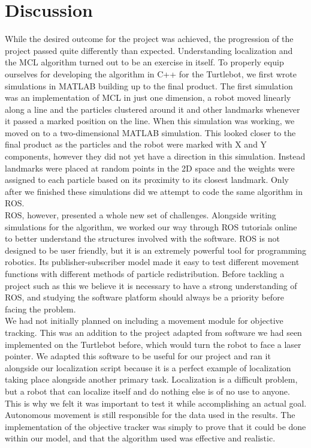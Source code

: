 \documentclass{article}
\newcommand\tab[1][0.5cm]{\hspace*{#1}}
\begin{document}
\section{Discussion}\label{fig:disc}
\tab While the desired outcome for the project was achieved, the progression of the project passed quite differently than expected. Understanding localization and the MCL algorithm turned out to be an exercise in itself. To properly equip ourselves for developing the algorithm in C++ for the Turtlebot, we first wrote simulations in MATLAB building up to the final product. The first simulation was an implementation of MCL in just one dimension, a robot moved linearly along a line and the particles clustered around it and other landmarks whenever it passed a marked position on the line. When this simulation was working, we moved on to a two-dimensional MATLAB simulation. This looked closer to the final product as the particles and the robot were marked with X and Y components, however they did not yet have a direction in this simulation. Instead landmarks were placed at random points in the 2D space and the weights were assigned to each particle based on its proximity to its closest landmark. Only after we finished these simulations did we attempt to code the same algorithm in ROS.\\

ROS, however, presented a whole new set of challenges. Alongside writing simulations for the algorithm, we worked our way through ROS tutorials online to better understand the structures involved with the software. ROS is not designed to be user friendly, but it is an extremely powerful tool for programming robotics. Its publisher-subscriber model made it easy to test different movement functions with different methods of particle redistribution. Before tackling a project such as this we believe it is necessary to have a strong understanding of ROS, and studying the software platform should always be a priority before facing the problem.\\

We had not initially planned on including a movement module for objective tracking. This was an addition to the project adapted from software we had seen implemented on the Turtlebot before, which would turn the robot to face a laser pointer\citep{Tracker}. We adapted this software to be useful for our project and ran it alongside our localization script because it is a perfect example of localization taking place alongside another primary task. Localization is a difficult problem, but a robot that can localize itself and do nothing else is of no use to anyone. This is why we felt it was important to test it while accomplishing an actual goal. Autonomous movement is still responsible for the data used in the results. The implementation of the objective tracker was simply to prove that it could be done within our model, and that the algorithm used was effective and realistic.\\
\end{document}
